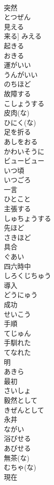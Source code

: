 \documentclass[8pt]{extreport}
\begin{document}
\begin{CJK}{UTF8}{min}
\\	突然	
\\	とつぜん
\\	見える	
\\	来る]	みえる
\\	起きる	
\\	おきる
\\	運がいい	
\\	うんがいい
\\	のちほど	
\\	故障する	
\\	こしょうする
\\	皮肉(な)	
\\	ひにく(な)
\\	足を折る	
\\	あしをおる
\\	かわいそうに	
\\	ビュービュー	
\\	いつ頃	
\\	いつごろ
\\	一言	
\\	ひとこと
\\	主張する	
\\	しゅちょうする
\\	先ほど	
\\	さきほど
\\	具合	
\\	ぐあい
\\	四六時中	
\\	しろくじちゅう
\\	導入	
\\	どうにゅう
\\	成功	
\\	せいこう
\\	手順	
\\	てじゅん
\\	手馴れた	
\\	てなれた
\\	明	
\\	あきら
\\	最初	
\\	さいしょ
\\	毅然として	
\\	きぜんとして
\\	永井	
\\	ながい
\\	浴びせる	
\\	あびせる
\\	無茶(な)	
\\	むちゃ(な)
\\	現在	

\end{CJK}
\end{document}
